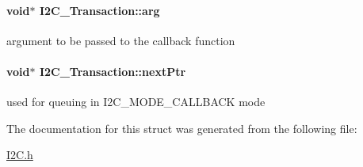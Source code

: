 \paragraph[{arg}]{\setlength{\rightskip}{0pt plus 5cm}void$\ast$ I2\+C\+\_\+\+Transaction\+::arg}\label{struct_i2_c___transaction_a29ec65addac2d4ef5d1235c2329e2fc1}
argument to be passed to the callback function 
\paragraph[{next\+Ptr}]{\setlength{\rightskip}{0pt plus 5cm}void$\ast$ I2\+C\+\_\+\+Transaction\+::next\+Ptr}\label{struct_i2_c___transaction_a21755edd4d999d6041d303e269596371}
used for queuing in I2\+C\+\_\+\+M\+O\+D\+E\+\_\+\+C\+A\+L\+L\+B\+A\+C\+K mode 

The documentation for this struct was generated from the following file\+:\begin{DoxyCompactItemize}
\item 
\hyperlink{_i2_c_8h}{I2\+C.\+h}\end{DoxyCompactItemize}
